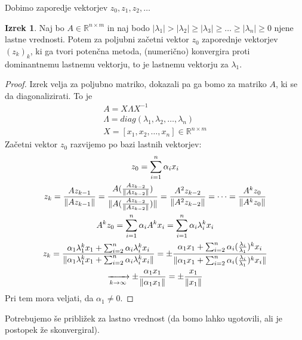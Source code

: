\documentclass[a4paper,12pt]{article}
\DeclarePairedDelimiter\norm{\lVert}{\rVert}
\theoremstyle{definition}
\newtheorem{theorem}[counter]{Izrek}
\theoremstyle{remark}
\newcommand{\R}{\mathbb{R}}
\begin{document}
Dobimo zaporedje vektorjev $z_0, z_1, z_2, \dots$

\begin{theorem}
    Naj bo $A \in \R^{n \times m}$ in naj bodo $|\lambda_1| > |\lambda_2| \geq |\lambda_3| \geq \dots \geq |\lambda_n| \geq 0$ njene lastne vrednosti.
    Potem za poljubni začetni vektor $z_0$ zaporednje vektorjev $(z_k)_k$, ki ga tvori potenčna metoda, (numerično) konvergira proti dominantnemu lastnemu 
    vektorju, to je lastnemu vektorju za $\lambda_1$.
\end{theorem}

\begin{proof}
    Izrek velja za poljubno matriko, dokazali pa ga bomo za matriko $A$, ki se da diagonalizirati. To je
    \begin{gather*}
        A = X \Lambda X^{-1} \\
        \Lambda = diag(\lambda_1, \lambda_2, \dots, \lambda_n) \\
         X = [x_1, x_2, \dots, x_n] \in \R^{n \times m}
    \end{gather*}
    Začetni vektor $z_0$ razvijemo po bazi lastnih vektorjev:
    \begin{gather*}
        z_0 = \sum_{i = 1}^{n} \alpha_i x_i \\
        z_k = \frac{A z_{k-1}}{\norm{A z_{k-1}}} = \frac{A (\frac{A z_{k-2}}{\norm{A z_{k-2}}})}{\norm{A (\frac{A z_{k-2}}{\norm{A z_{k-2}}})}} = \frac{A^2 z_{k-2}}{\norm{A^2 z_{k-2}}} = \dots = \frac{A^k z_0}{\norm{A^k z_0}} \\ 
        A^k z_0 = \sum_{i=1}^{n} \alpha_i A^k x_i = \sum_{i=1}^{n} \alpha_i \lambda_i^k x_i \\
        z_k = \frac{\alpha_1 \lambda_1^k x_1 + \sum_{i=2}^{n}\alpha_i \lambda_i^k x_i}{\norm{\alpha_1 \lambda_1^k x_1 + \sum_{i=2}^{n}\alpha_i \lambda_i^k x_i}} = \pm \frac{\alpha_1 x_1 + \sum_{i=2}^{n}\alpha_i (\frac{\lambda_i}{\lambda_1})^k x_i}{\norm{\alpha_1 x_1 + \sum_{i=2}^{n}\alpha_i (\frac{\lambda_i}{\lambda_1})^k x_i}} \\
        \xrightarrow[k \to \infty]{} \pm \frac{\alpha_1 x_1}{\norm{\alpha_1 x_1}} = \pm \frac{x_1}{\norm{x_1}}
    \end{gather*}
    Pri tem mora veljati, da $\alpha_1 \neq 0$.
\end{proof}


Potrebujemo še približek za lastno vrednost (da bomo lahko ugotovili, ali je postopek že skonvergiral).
\end{document}
